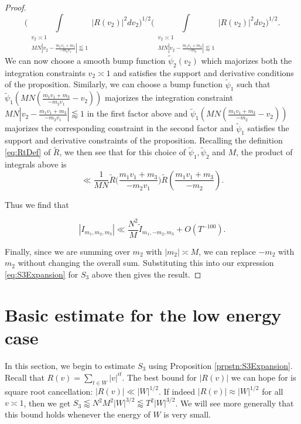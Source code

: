 \documentclass{amsart}
\theoremstyle{plain}
\numberwithin{equation}{section}
\renewcommand{\tilde}{\widetilde}
\begin{document}
\begin{proof}
\[  
\Biggl( \int\limits_{\substack{v_2\asymp 1\\ M N| v_2 - \frac{m_1 v_1 + m_3}{-m_2v_1} | \lessapprox 1 }}  | R(v_2) |^2  dv_2 \Biggr)^{1/2}  \Biggl( \int\limits_{\substack{v_2\asymp 1\\ MN| v_2 - \frac{m_1 v_1 + m_3}{-m_2} | \lessapprox  1}}  | R( v_2 ) |^2 dv_2 \Biggr)^{1/2}.
\]
We can now choose a smooth bump function $\tilde{\psi}_2(v_2)$ which majorizes both the integration constraints $v_2\asymp 1$ and satisfies the support and derivative conditions of the proposition. Similarly, we can choose a bump function $\tilde{\psi}_1$ such that $\tilde{\psi}_1(MN(\frac{m_1v_1+m_3}{-m_2v_1}-v_2))$ majorizes the integration constraint $M N| v_2 - \frac{m_1 v_1 + m_3}{-m_2v_1} | \lessapprox 1$ in the first factor above and $\tilde{\psi}_1(MN(\frac{m_1v_1+m_3}{-m_2}-v_2))$ majorizes the corresponding constraint in the second factor and $\tilde{\psi}_1$ satisfies the support and derivative constraints of the proposition. Recalling the definition \eqref{eq:RtDef} of $\tilde{R}$, we then see that for this choice of $\tilde{\psi}_1,\tilde{\psi}_2$ and $M$, the product of integrals above is
\[ 
\ll \frac{1}{MN}  \tilde{R} \Big( \frac{m_1 v_1 + m_3}{-m_2 v_1} \Big) \tilde{R} \left( \frac{m_1 v_1 + m_3}{-m_2} \right) . 
\]

Thus we find that

\[
|I_{m_1,m_2,m_3}| \ll \frac{N^2}{M} \tilde{I}_{m_1,-m_2,m_3}+O(T^{-100}).
\]

Finally, since we are summing over $m_2$ with $|m_2| \asymp M$, we can replace $- m_2$ with $m_2$ without changing the overall sum. Substituting this into our expression \eqref{eq:S3Expansion} for $S_3$ above then gives the result.
\end{proof}

%
%
%
%

\section{Basic estimate for the low energy case}

In this section,  we begin to estimate $S_3$ using Proposition \ref{prpstn:S3Expansion}.    Recall that $R(v) = \sum_{t \in W} |v|^{it}$.   The best bound for $|R(v)|$ we can hope for is square root cancellation: $|R(v)| \ll |W|^{1/2}$.   If indeed $|R(v)| \approx |W|^{1/2}$ for all $v \asymp 1$, then we get $S_3 \lessapprox N^2 M^2 |W|^{3/2} \lessapprox T^2 |W|^{3/2}$.   We will see more generally that this bound holds whenever the energy of $W$ is very small. 
\end{document}
